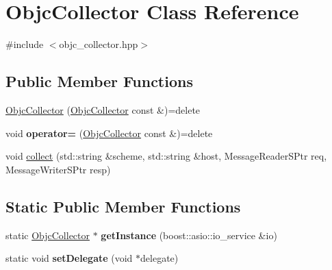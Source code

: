 \hypertarget{class_objc_collector}{}\section{Objc\+Collector Class Reference}
\label{class_objc_collector}


{\ttfamily \#include $<$objc\+\_\+collector.\+hpp$>$}

\subsection*{Public Member Functions}
\begin{DoxyCompactItemize}
\item 
\hyperlink{class_objc_collector_a8648b6ea89441339da4f8386b3132fdf}{Objc\+Collector} (\hyperlink{class_objc_collector}{Objc\+Collector} const \&)=delete
\item 
\mbox{\label{class_objc_collector_aa4b5f226cb4ae0af76a5e86e235add12}} 
void {\bfseries operator=} (\hyperlink{class_objc_collector}{Objc\+Collector} const \&)=delete
\item 
void \hyperlink{class_objc_collector_a9518ac372bd2ef1d765bb715730c1f6c}{collect} (std\+::string \&scheme, std\+::string \&host, Message\+Reader\+S\+Ptr req, Message\+Writer\+S\+Ptr resp)
\end{DoxyCompactItemize}
\subsection*{Static Public Member Functions}
\begin{DoxyCompactItemize}
\item 
\mbox{\label{class_objc_collector_a95ca99de538f642d4eb4fb01a8dee3b4}} 
static \hyperlink{class_objc_collector}{Objc\+Collector} $\ast$ {\bfseries get\+Instance} (boost\+::asio\+::io\+\_\+service \&io)
\item 
\mbox{\label{class_objc_collector_afe187c7f7caebabcd3b6faebbdab71e9}} 
static void {\bfseries set\+Delegate} (void $\ast$delegate)
\end{DoxyCompactItemize}
